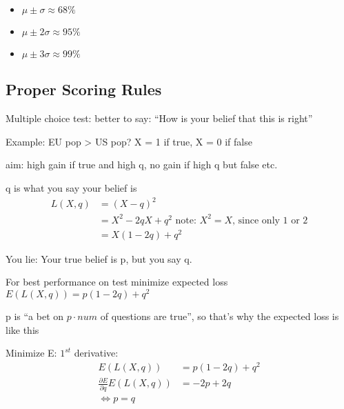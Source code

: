 \begin{itemize}
	\item $\mu \pm \sigma \approx 68\%$
	\item $\mu \pm 2\sigma \approx 95\%$
	\item $\mu \pm 3\sigma \approx 99\%$
\end{itemize}

\subsection{Proper Scoring Rules}
Multiple choice test: better to say: ``How is your belief that this is right''

Example: EU pop > US pop? X = 1 if true, X = 0 if false

aim: high gain if true and high q, no gain if high q but false etc.

q is what you say your belief is 
\begin{align*}
L(X,q) &= (X-q)^2 \\
       &= X^2-2qX+q^2 \mbox{ note: $X^2 = X$, since only 1 or 2} \\
       &= X(1-2q)+q^2
\end{align*}

You lie: Your true belief is p, but you say q.

For best performance on test minimize expected loss $E(L(X,q)) = p(1-2q)+q^2$

p is ``a bet on $p\cdot num$ of questions are true'', so that's why the expected loss is like this

Minimize E: $1^{st}$ derivative:
\begin{align*}
E(L(X,q)) &= p(1-2q)+q^2 \\
\frac{\partial E}{\partial q}E(L(X,q)) &= -2p + 2q \\
\Leftrightarrow p = q
\end{align*}





